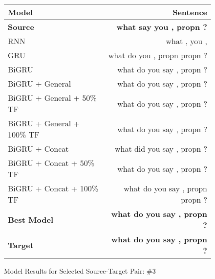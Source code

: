 \documentclass[twoside,twocolumn]{article}
\newlength\mystoreparindent
\newenvironment{myparindent}[1]{%
  \setlength{\mystoreparindent}{\the\parindent}
  \setlength{\parindent}{#1}
  }{%
  \setlength{\parindent}{\mystoreparindent}
}
\begin{document}
\begin{myparindent}{0pt}
\begin{figure}[ht!]
    \centering
    \begin{tabular}{ |l|r| }
        \hline
        \textbf{Model}
          & \textbf{Sentence} \\
        \hline
        \textbf{Source} & \textbf{what say you , propn ?} \\ \hline
        RNN & what , you , \\ \hline
        GRU & what do you , propn propn ? \\ \hline
        BiGRU & what do you say , propn ? \\ \hline
        BiGRU + General & what do you say , propn ? \\ \hline
        BiGRU + General + 50\% TF & what do you say , propn ? \\ \hline
        BiGRU + General + 100\% TF & what do you say , propn ? \\ \hline
        BiGRU + Concat & what did you say , propn ? \\ \hline
        BiGRU + Concat + 50\% TF & what do you say , propn ? \\ \hline
        BiGRU + Concat + 100\% TF & what do you say , propn propn ? \\ \hline
        \textbf{Best Model} & \textbf{what do you say , propn ?} \\ \hline
        \textbf{Target} & \textbf{what do you say , propn ?} \\ \hline
    \end{tabular}
    \caption{Model Results for Selected Source-Target Pair: \#3}
    \label{fig:model-results-3}
\end{figure}


\end{myparindent}
\end{document}
